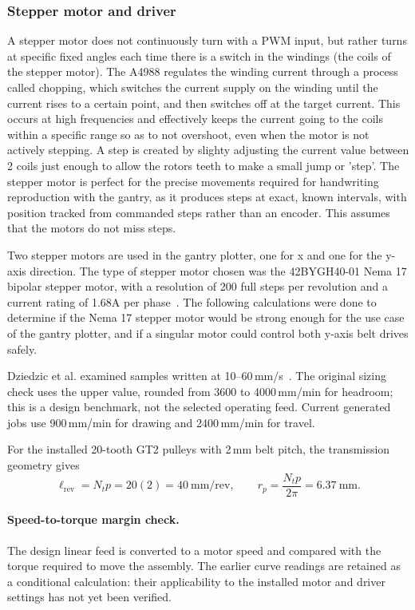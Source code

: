 \subsubsection{Stepper motor and driver}
\label{sec:des-stepper}
A stepper motor does not continuously turn with a PWM input, but rather turns at specific fixed angles each time there is a switch in the windings (the coils of the stepper motor). The A4988 regulates the winding current through a process called chopping, which switches the current supply on the winding until the current rises to a certain point, and then switches off at the target current.  This occurs at high frequencies and effectively keeps the current going to the coils within a specific range so as to not overshoot, even when the motor is not actively stepping. A step is created by slighty adjusting the current value between 2 coils just enough to allow the rotors teeth to make a small jump or 'step'. The stepper motor is perfect for the precise movements required for handwriting reproduction with the gantry, as it produces steps at exact, known intervals, with position tracked from commanded steps rather than an encoder. This assumes that the motors do not miss steps. 

Two stepper motors are used in the gantry plotter, one for x and one for the y-axis direction. The type of stepper motor chosen was the 42BYGH40-01 Nema 17 bipolar stepper motor, with a resolution of 200 full steps per revolution and a current rating of 1.68A per phase~\cite{stepperds}. The following calculations were done to determine if the Nema 17 stepper motor would be strong enough for the use case of the gantry plotter, and if a singular motor could control both y-axis belt drives safely.

Dziedzic et al. examined samples written at 10--60\,mm/s~\cite{dziedzic2026}. The original sizing check uses the upper value, rounded from 3600 to 4000\,mm/min for headroom; this is a design benchmark, not the selected operating feed. Current generated jobs use 900\,mm/min for drawing and 2400\,mm/min for travel.

For the installed 20-tooth GT2 pulleys with 2\,mm belt pitch, the transmission geometry gives~\cite{acarnley2002}
\begin{equation}
\ell_{\mathrm{rev}}=N_t p=20(2)=40\ \mathrm{mm/rev},\qquad
r_p=\frac{N_t p}{2\pi}=6.37\ \mathrm{mm}.
\label{eq:des-pulley}
\end{equation}
\paragraph{Speed-to-torque margin check.}
The design linear feed is converted to a motor speed and compared with the torque required to move the assembly. The earlier curve readings are retained as a conditional calculation: their applicability to the installed motor and driver settings has not yet been verified.

